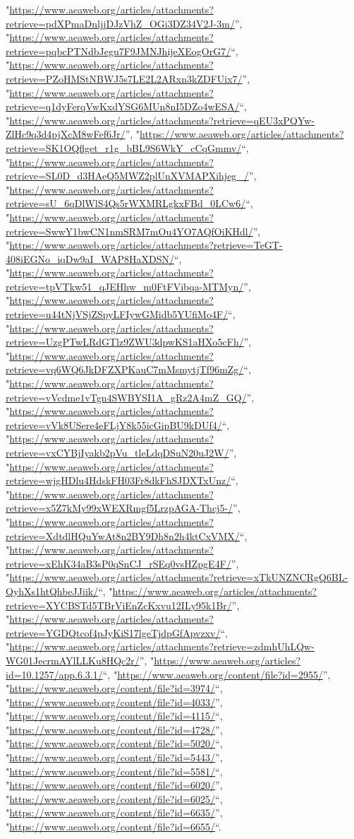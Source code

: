 \documentclass[]{article}
\begin{document}
\begin{itemize}
  "\url{https://www.aeaweb.org/articles/attachments?retrieve=pdXPmaDnljjDJzVhZ_OGi3DZ34V2J-3m/}'',
  "\url{https://www.aeaweb.org/articles/attachments?retrieve=pqbcPTNdbJegu7F9JMNJhijeXEogOrG7/}``,
  "\url{https://www.aeaweb.org/articles/attachments?retrieve=PZoHMStNBWJ5s7LE2L2ARxn3kZDFUix7/}'',
  "\url{https://www.aeaweb.org/articles/attachments?retrieve=q1dyFerqVwKxdYSG6MUn8nI5DZo4wESA/}``,
  "\url{https://www.aeaweb.org/articles/attachments?retrieve=qEU3xPQYw-ZlHc9q3d4pjXcM8wFef6Jr/}'',
  "\url{https://www.aeaweb.org/articles/attachments?retrieve=SK1OQflget_r1g_bBL9S6WkY_cCqGmmv/}``,
  "\url{https://www.aeaweb.org/articles/attachments?retrieve=SL0D_d3HAeQ5MWZ2plUnXVMAPXihjeg_/}'',
  "\url{https://www.aeaweb.org/articles/attachments?retrieve=sU_6qDlWlS4Qs5rWXMRLgkxFBd_0LCw6/}``,
  "\url{https://www.aeaweb.org/articles/attachments?retrieve=SwwY1bwCN1nmSRM7mOu4YO7AQfOiKHdl/}'',
  "\url{https://www.aeaweb.org/articles/attachments?retrieve=TeGT-408iEGNo_iqDw9aI_WAP8HaXDSN/}``,
  "\url{https://www.aeaweb.org/articles/attachments?retrieve=tpVTkw51_qJEHhw_m0FtFVibqa-MTMyn/}'',
  "\url{https://www.aeaweb.org/articles/attachments?retrieve=u44tNjVSjZSpyLFIywGMidb5YUfiMo4F/}``,
  "\url{https://www.aeaweb.org/articles/attachments?retrieve=UzgPTwLRdGTlz9ZWU3dpwKS1aHXo5cFh/}'',
  "\url{https://www.aeaweb.org/articles/attachments?retrieve=vq6WQ6JkDFZXPKauC7mMsmytjTf96mZg/}``,
  "\url{https://www.aeaweb.org/articles/attachments?retrieve=vVcdme1vTgn4SWBYSI1A_gRz2A4mZ_GQ/}'',
  "\url{https://www.aeaweb.org/articles/attachments?retrieve=vVk8USere4eFLjY8k55icGipBU9kDUf4/}``,
  "\url{https://www.aeaweb.org/articles/attachments?retrieve=vxCYBjIyakb2pVu_tleLdqDSuN20uJ2W/}'',
  "\url{https://www.aeaweb.org/articles/attachments?retrieve=wjgHDlu4HdskFH03Fr8dkFhSJDXTxUnz/}``,
  "\url{https://www.aeaweb.org/articles/attachments?retrieve=x5Z7kMy99xWEXRmgf5LrzpAGA-Thcj5-/}'',
  "\url{https://www.aeaweb.org/articles/attachments?retrieve=XdtdlHQuYwAt8n2BY9Dh8n2h4ktCxVMX/}``,
  "\url{https://www.aeaweb.org/articles/attachments?retrieve=xEhK34aB3sP0qSnCJ_rSEq0vsHZpgE4F/}'',
  "\url{https://www.aeaweb.org/articles/attachments?retrieve=xTkUNZNCRgQ6BL-QyhXs1htQhbeJJiik/}``,
  "\url{https://www.aeaweb.org/articles/attachments?retrieve=XYCBSTd5TBrViEnZcKxvu12ILy95k1Br/}'',
  "\url{https://www.aeaweb.org/articles/attachments?retrieve=YGDQtcof4pJyKiS17lgeTjdpGfApvzxv/}``,
  "\url{https://www.aeaweb.org/articles/attachments?retrieve=zdmhUhLQw-WG01JecrmAYlLLKu8HQc2r/}'',
  "\url{https://www.aeaweb.org/articles?id=10.1257/app.6.3.1/}``,
  "\url{https://www.aeaweb.org/content/file?id=2955/}'',
  "\url{https://www.aeaweb.org/content/file?id=3974/}``,
  "\url{https://www.aeaweb.org/content/file?id=4033/}'',
  "\url{https://www.aeaweb.org/content/file?id=4115/}``,
  "\url{https://www.aeaweb.org/content/file?id=4728/}'',
  "\url{https://www.aeaweb.org/content/file?id=5020/}``,
  "\url{https://www.aeaweb.org/content/file?id=5443/}'',
  "\url{https://www.aeaweb.org/content/file?id=5581/}``,
  "\url{https://www.aeaweb.org/content/file?id=6020/}'',
  "\url{https://www.aeaweb.org/content/file?id=6025/}``,
  "\url{https://www.aeaweb.org/content/file?id=6635/}'',
  "\url{https://www.aeaweb.org/content/file?id=6655/}``.
\end{itemize}
\end{document}
